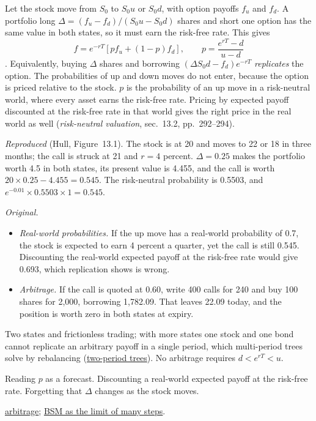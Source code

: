 \begin{qfmethod}\label{meth:one-period-binomial-valuation}
 Let the stock move from $S_0$ to $S_0u$ or $S_0d$, with option payoffs $f_u$ and $f_d$. A portfolio long $\Delta=(f_u-f_d)/(S_0u-S_0d)$ shares and short one option has the same value in both states, so it must earn the risk-free rate. This gives
\[ f=e^{-rT}[pf_u+(1-p)f_d],\qquad p=\frac{e^{rT}-d}{u-d} \]
\citep[chap.~13, sec.~13.1, eqs.~(13.1)--(13.3), pp.~288--292]{s7-hulloptions}. Equivalently, buying $\Delta$ shares and borrowing $(\Delta S_0d-f_d)e^{-rT}$ \emph{replicates} the option. The probabilities of up and down moves do not enter, because the option is priced relative to the stock. $p$ is the probability of an up move in a risk-neutral world, where every asset earns the risk-free rate. Pricing by expected payoff discounted at the risk-free rate in that world gives the right price in the real world as well (\emph{risk-neutral valuation}, sec.~13.2, pp.~292--294).

 \emph{Reproduced} (Hull, Figure~13.1). The stock is at 20 and moves to 22 or 18 in three months; the call is struck at 21 and $r=4$ percent. $\Delta=0.25$ makes the portfolio worth 4.5 in both states, its present value is 4.455, and the call is worth $20\times0.25-4.455=0.545$. The risk-neutral probability is 0.5503, and $e^{-0.01}\times0.5503\times1=0.545$.

\emph{Original.}
\begin{itemize}
\item \emph{Real-world probabilities.} If the up move has a real-world probability of 0.7, the stock is expected to earn 4 percent a quarter, yet the call is still 0.545. Discounting the real-world expected payoff at the risk-free rate would give 0.693, which replication shows is wrong.
\item \emph{Arbitrage.} If the call is quoted at 0.60, write 400 calls for 240 and buy 100 shares for 2{,}000, borrowing 1{,}782.09. That leaves 22.09 today, and the position is worth zero in both states at expiry.
\end{itemize}

 Two states and frictionless trading; with more states one stock and one bond cannot replicate an arbitrary payoff in a single period, which multi-period trees solve by rebalancing (\hyperref[meth:multi-period-binomial-valuation]{two-period trees}). No arbitrage requires $d<e^{rT}<u$.

 Reading $p$ as a forecast. Discounting a real-world expected payoff at the risk-free rate. Forgetting that $\Delta$ changes as the stock moves.

 \hyperref[meth:arbitrage-replication-carry]{arbitrage}; \hyperref[mod:black-scholes-merton]{BSM as the limit of many steps}.

\end{qfmethod}

